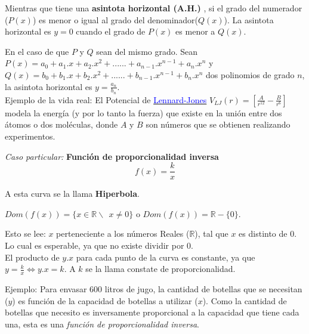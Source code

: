 \documentclass[a4paper,11pt,spanish,sans]{exam}
\begin{document}
Mientras que tiene una \textbf{asintota horizontal (A.H.)} , si el grado del numerador ($P(x)$) es menor o igual al grado del denominador($Q(x)$).
La asintota horizontal es $y=0$ cuando el grado de $P(x)$ es menor a $Q(x)$.

En el caso de que $P$ y $Q$ sean del mismo grado. 
Sean $P(x)=a_0+a_1.x+a_2.x^2+......+a_{n-1}.x^{n-1}+a_n.x^n$ y $Q(x)=b_0+b_1.x+b_2.x^2+......+b_{n-1}.x^{n-1}+b_n.x^n$ dos polinomios de grado $n$, la asintota horizontal es $y=\frac{a_n}{b_n}$. \\


Ejemplo de la vida real: El Potencial de \href{https://es.wikipedia.org/wiki/Potencial_de_Lennard-Jones}{\textcolor{blue}{Lennard-Jones}}  $V_{LJ}(r)=[\frac{A}{r^{12}}-\frac{B}{r^6}]$  modela la energía (y por lo tanto la fuerza) que existe en la unión entre dos átomos o dos moléculas, donde $A$ y $B$ son números que se obtienen realizando experimentos.


\label{inversa}
\emph{Caso particular:} \textbf{Función de proporcionalidad inversa}
\[f(x)=\frac{k}{x}\]
\begin{flushright}
A esta curva se la llama \textbf{Hiperbola}.
\end{flushright}

$Dom(f(x))=\lbrace x \in \mathbb{R} \backslash \:  \: x\neq 0 \rbrace$ o 
$Dom(f(x))= \mathbb{R} - \lbrace 0\rbrace  $.

Esto se lee: $x$ perteneciente a los números  Reales ($\mathbb{R}$), tal que $x$ es distinto de $0$.
Lo cual es esperable, ya que no existe dividir por 0.\\ 

El producto de $y.x$ para cada punto de la curva es constante, ya que $y=\frac{k}{x} \Leftrightarrow y.x=k $. A $k$ se la llama constate de proporcionalidad.



Ejemplo: 
Para envasar 600 litros de jugo, la cantidad de botellas que se necesitan ($y$) es función de la capacidad de botellas a utilizar ($x$). Como la cantidad de botellas que necesito es inversamente proporcional a la capacidad que tiene cada una, esta es una \emph{función de proporcionalidad inversa}. 
\end{document}
